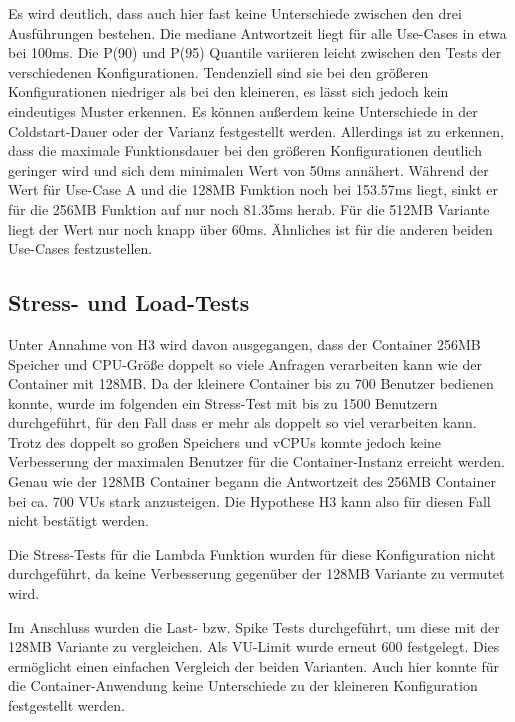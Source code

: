 Es wird deutlich, dass auch hier fast keine Unterschiede zwischen den drei Ausführungen bestehen. Die mediane Antwortzeit liegt für alle Use-Cases in etwa bei 100ms. Die P(90) und P(95) Quantile variieren leicht zwischen den Tests der verschiedenen Konfigurationen. Tendenziell sind sie bei den größeren Konfigurationen niedriger als bei den kleineren, es lässt sich jedoch kein eindeutiges Muster erkennen. Es können außerdem keine Unterschiede in der Coldstart-Dauer oder der Varianz festgestellt werden. 
Allerdings ist zu erkennen, dass die maximale Funktionsdauer bei den größeren Konfigurationen deutlich geringer wird und sich dem minimalen Wert von 50ms annähert. Während der Wert für Use-Case A und die 128MB Funktion noch bei 153.57ms liegt, sinkt er für die 256MB Funktion auf nur noch 81.35ms herab. Für die 512MB Variante liegt der Wert nur noch knapp über 60ms. Ähnliches ist für die anderen beiden Use-Cases festzustellen. 

\subsection{Stress- und Load-Tests}
Unter Annahme von H3 wird davon ausgegangen, dass der Container 256MB Speicher und CPU-Größe doppelt so viele Anfragen verarbeiten kann wie der Container mit 128MB. Da der kleinere Container bis zu 700 Benutzer bedienen konnte, wurde im folgenden ein Stress-Test mit bis zu 1500 Benutzern durchgeführt, für den Fall dass er mehr als doppelt so viel verarbeiten kann.
Trotz des doppelt so großen Speichers und vCPUs konnte jedoch keine Verbesserung der maximalen Benutzer für die Container-Instanz erreicht werden. Genau wie der 128MB Container begann die Antwortzeit des 256MB Container bei ca. 700 VUs stark anzusteigen. Die Hypothese H3 kann also für diesen Fall nicht bestätigt werden.

Die Stress-Tests für die Lambda Funktion wurden für diese Konfiguration nicht durchgeführt, da keine Verbesserung gegenüber der 128MB Variante zu vermutet wird. 

Im Anschluss wurden die Last- bzw. Spike Tests durchgeführt, um diese mit der 128MB Variante zu vergleichen. Als VU-Limit wurde erneut 600 festgelegt. Dies ermöglicht einen einfachen Vergleich der beiden Varianten.
Auch hier konnte für die Container-Anwendung keine Unterschiede zu der kleineren Konfiguration festgestellt werden. 

